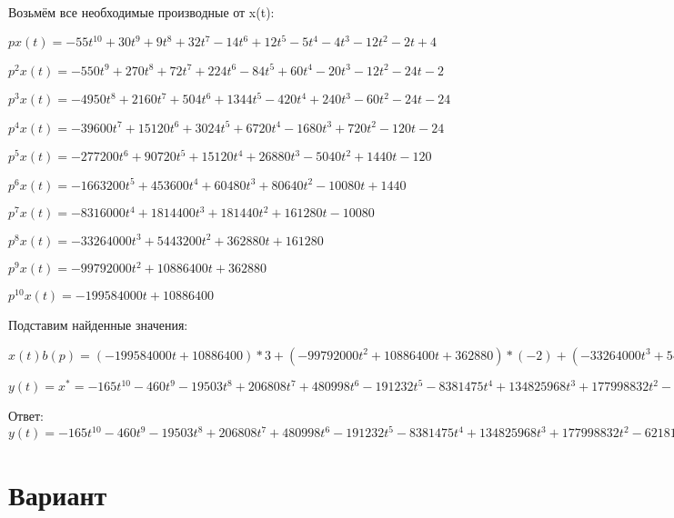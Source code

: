 \documentclass{article}
\begin{document}
{{{Возьмём все необходимые производные от x(t):

$px(t)=-55t^{10}+30t^{9}+9t^{8}+32t^{7}-14t^{6}+12t^{5}-5t^{4}-4t^{3}-12t^{2}-2t+4$

$p^2x(t)=-550t^{9}+270t^{8}+72t^{7}+224t^{6}-84t^{5}+60t^{4}-20t^{3}-12t^{2}-24t-2$

$p^3x(t)=-4950t^{8}+2160t^{7}+504t^{6}+1344t^{5}-420t^{4}+240t^{3}-60t^{2}-24t-24$

$p^4x(t)=-39600t^{7}+15120t^{6}+3024t^{5}+6720t^{4}-1680t^{3}+720t^{2}-120t-24$

$p^5x(t)=-277200t^{6}+90720t^{5}+15120t^{4}+26880t^{3}-5040t^{2}+1440t-120$

$p^6x(t)=-1663200t^{5}+453600t^{4}+60480t^{3}+80640t^{2}-10080t+1440$

$p^7x(t)=-8316000t^{4}+1814400t^{3}+181440t^{2}+161280t-10080$

$p^8x(t)=-33264000t^{3}+5443200t^{2}+362880t+161280$

$p^9x(t)=-99792000t^{2}+10886400t+362880$

$p^10x(t)=-199584000t+10886400$

Подставим найденные значения:

$x(t)b(p) = (-199584000t+10886400)*3+(-99792000t^{2}+10886400t+362880)*(-2)+(-33264000t^{3}+5443200t^{2}+362880t+161280)*(-4)+(-8316000t^{4}+1814400t^{3}+181440t^{2}+161280t-10080)*1+(-277200t^{6}+90720t^{5}+15120t^{4}+26880t^{3}-5040t^{2}+1440t-120)*(-2)+(-39600t^{7}+15120t^{6}+3024t^{5}+6720t^{4}-1680t^{3}+720t^{2}-120t-24)*(-5)+(-4950t^{8}+2160t^{7}+504t^{6}+1344t^{5}-420t^{4}+240t^{3}-60t^{2}-24t-24)*4+(-550t^{9}+270t^{8}+72t^{7}+224t^{6}-84t^{5}+60t^{4}-20t^{3}-12t^{2}-24t-2)*1+(-55t^{10}+30t^{9}+9t^{8}+32t^{7}-14t^{6}+12t^{5}-5t^{4}-4t^{3}-12t^{2}-2t+4)*2+(-55t^{10}+30t^{9}+9t^{8}+32t^{7}-14t^{6}+12t^{5}-5t^{4}-4t^{3}-12t^{2}-2t+4)*1=-165t^{10}-460t^{9}-19503t^{8}+206808t^{7}+480998t^{6}-191232t^{5}-8381475t^{4}+134825968t^{3}+177998832t^{2}-621817446t$





$y(t)=x^*=-165t^{10}-460t^{9}-19503t^{8}+206808t^{7}+480998t^{6}-191232t^{5}-8381475t^{4}+134825968t^{3}+177998832t^{2}-621817446t$

Ответ: $y(t) = -165t^{10}-460t^{9}-19503t^{8}+206808t^{7}+480998t^{6}-191232t^{5}-8381475t^{4}+134825968t^{3}+177998832t^{2}-621817446t$

\section{Вариант}

}}}
\end{document}

